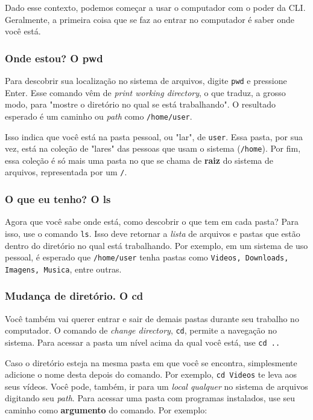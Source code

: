 \documentclass{article}
\begin{document}
	Dado esse contexto, podemos começar a usar o computador com o poder da CLI. Geralmente, a primeira coisa que se faz ao 
	entrar no computador é saber onde você está. 
	
	\subsubsection{Onde estou? O pwd}
	Para descobrir sua localização no sistema de arquivos, digite \texttt{pwd} e pressione Enter. Esse comando vêm de 
	\textit{print working directory}, o que traduz, a grosso modo, para "mostre o diretório no qual se está trabalhando". O
	resultado esperado é um caminho ou \textit{path} como \texttt{/home/user}. 

	Isso indica que você está na pasta pessoal, ou "lar", de \texttt{user}. Essa pasta, por sua vez, está 
	na coleção de "lares" das pessoas que usam o sistema (\texttt{/home}). Por fim, essa coleção é só mais uma pasta no que 
	se chama de \textbf{raiz} do sistema de arquivos, representada por um \texttt{/}. 

	\subsubsection{O que eu tenho? O ls} 

	Agora que você sabe onde está, como descobrir o que tem em cada pasta? Para isso, use o comando \texttt{ls}. Isso deve
	retornar a \textit{lista} de arquivos e pastas que estão dentro do diretório no qual está trabalhando. Por exemplo, em um sistema
	de uso pessoal, é esperado que \texttt{/home/user} tenha pastas como \texttt{Videos, Downloads, Imagens, Musica}, entre
	outras. 
	
	\subsubsection{Mudança de diretório. O cd} 

	Você também vai querer entrar e sair de demais pastas durante seu trabalho no computador. O comando de \textit{change
	directory}, \texttt{cd}, permite a navegação no sistema. Para acessar a pasta um nível acima da qual você está, use 
	\texttt{cd ..} 


	Caso o diretório esteja na mesma pasta em que você se encontra, simplesmente adicione o nome desta depois do comando. 
	Por exemplo, \texttt{cd Videos} te leva aos seus vídeos. Você pode, também, ir para um \textit{local qualquer} no sistema
	de arquivos digitando seu \textit{path}. Para acessar uma pasta com programas instalados, use seu caminho como 
	\textbf{argumento} do comando. Por exemplo: 
	
\end{document}
